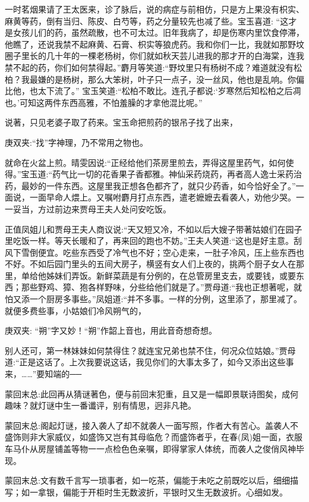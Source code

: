 \begin{parag}
    一时茗烟果请了王太医来，诊了脉后，说的病症与前相仿，只是方上果没有枳实、麻黄等药，倒有当归、陈皮、白芍等，药之分量较先也减了些。宝玉喜道: “这才是女孩儿们的药，虽然疏散，也不可太过。旧年我病了，却是伤寒内里饮食停滞，他瞧了，还说我禁不起麻黄、石膏、枳实等狼虎药。我和你们一比，我就如那野坟圈子里长的几十年的一棵老杨树，你们就如秋天芸儿进我的那才开的白海棠，连我禁不起的药，你们如何禁得起。”麝月等笑道:“野坟里只有杨树不成？难道就没有松柏？我最嫌的是杨树，那么大笨树，叶子只一点子，没一丝风，他也是乱响。你偏比他，也太下流了。” 宝玉笑道:“松柏不敢比。连孔子都说:‘岁寒然后知松柏之后凋也。’可知这两件东西高雅，不怕羞臊的才拿他混比呢。”
\end{parag}


\begin{parag}
    说著，只见老婆子取了药来。宝玉命把煎药的银吊子找了出来，\begin{note}庚双夹:“找”字神理，乃不常用之物也。\end{note}就命在火盆上煎。晴雯因说:“正经给他们茶房里煎去，弄得这屋里药气，如何使得。”宝玉道:“药气比一切的花香果子香都雅。神仙采药烧药，再者高人逸士采药治药，最妙的一件东西。这屋里我正想各色都齐了，就只少药香，如今恰好全了。”一面说，一面早命人煨上。又嘱咐麝月打点东西，遣老嬷嬷去看袭人，劝他少哭。一一妥当，方过前边来贾母王夫人处问安吃饭。
\end{parag}


\begin{parag}
    正值凤姐儿和贾母王夫人商议说:“天又短又冷，不如以后大嫂子带著姑娘们在园子里吃饭一样。等天长暖和了，再来回的跑也不妨。”王夫人笑道:“这也是好主意。刮风下雪倒便宜。吃些东西受了冷气也不好；空心走来，一肚子冷风，压上些东西也不好。不如后园门里头的五间大房子，横竖有女人们上夜的，挑两个厨子女人在那里，单给他姊妹们弄饭。新鲜菜蔬是有分例的，在总管房里支去，或要钱，或要东西；那些野鸡、獐、狍各样野味，分些给他们就是了。”贾母道:“我也正想著呢，就怕又添一个厨房多事些。”凤姐道:“并不多事。一样的分例，这里添了，那里减了。就便多费些事，小姑娘们冷风朔气的，\begin{note}庚双夹: “朔”字又妙！“朔”作韶上音也，用此音奇想奇想。\end{note}别人还可，第一林妹妹如何禁得住？就连宝兄弟也禁不住，何况众位姑娘。”贾母道:“正是这话了。上次我要说这话，我见你们的大事太多了，如今又添出这些事来，……”要知端的──
\end{parag}


\begin{parag}
    \begin{note}蒙回末总:此回再从猜谜著色，便与前回末犯重，且又是一幅即景联诗图矣，成何趣味？就灯谜中生一番谶评，别有情思，迥非凡艳。\end{note}
\end{parag}


\begin{parag}
    \begin{note}蒙回末总:阁起灯谜，接入袭人了却不就袭人一面写照，作者大有苦心。盖袭人不盛饰则非大家威仪，如盛饰又岂有其母临危？而盛饰者乎，在春(凤)姐一面，衣服车马仆从房屋铺盖等物一一点检色色亲嘱，即得掌家人体统，而袭人之俊俏风神毕现。\end{note}
\end{parag}


\begin{parag}
    \begin{note}蒙回末总:文有数千言写一琐事者，如一吃茶，偏能于未吃之前既吃以后，细细描写；如一拿银，偏能于开柜时生无数波折，平银时又生无数波折。心细如发。\end{note}
\end{parag}
